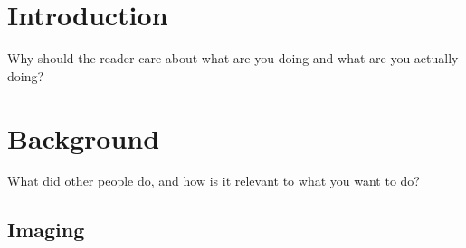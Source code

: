 \documentclass{l4proj}
\begin{document}
%
%
%
%
%
%
%
\chapter{Introduction}



Why should the reader care about what are you doing and what are you actually doing?



\chapter{Background}
What did other people do, and how is it relevant to what you want to do?

\section{Imaging}
\end{document}
